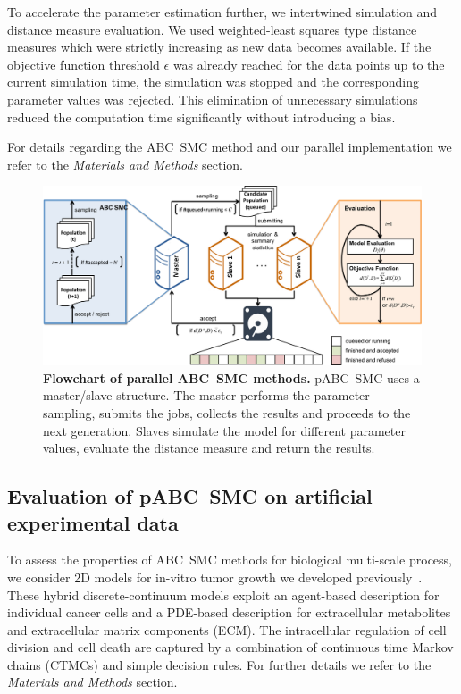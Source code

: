 \documentclass[10pt,letterpaper]{article}
\begin{document}
To accelerate the parameter estimation further, we intertwined simulation and distance measure evaluation. We used weighted-least squares type distance measures which were strictly increasing as new data becomes available. If the objective function threshold $\epsilon$ was already reached for the data points up to the current simulation time, the simulation was stopped and the corresponding parameter values was rejected. This elimination of unnecessary simulations reduced the computation time significantly without introducing a bias.

For details regarding the ABC~SMC method and our parallel implementation we refer to the \textit{Materials and Methods} section.

\begin{figure}[t]
\includegraphics[width=\textwidth]{Figures/Pipeline.pdf}
\caption{{\bf Flowchart of parallel ABC~SMC methods.}
pABC~SMC uses a master/slave structure. The master performs the parameter sampling, submits the jobs, collects the results and proceeds to the next generation. Slaves simulate the model for different parameter values, evaluate the distance measure and return the results.
}
\label{fig:Pipeline}
\end{figure}

\subsection*{Evaluation of pABC~SMC on artificial experimental data}

To assess the properties of ABC~SMC methods for biological multi-scale process, we consider 2D models for in-vitro tumor growth we developed previously~\cite{JagiellaMul2015}. These hybrid discrete-continuum models exploit an agent-based description for individual cancer cells and a PDE-based description for extracellular metabolites and extracellular matrix components (ECM). The intracellular regulation of cell division and cell death are captured by a combination of continuous time Markov chains (CTMCs) and simple decision rules. For further details we refer to the \textit{Materials and Methods} section.
\end{document}

